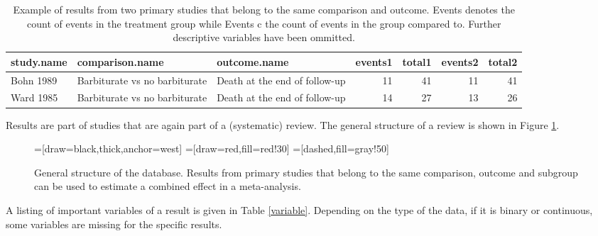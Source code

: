 \documentclass[11pt,a4paper,twoside]{book}\usepackage[]{graphicx}\usepackage[]{color}
\begin{document}
\begin{table}[ht]
\centering
\begingroup\scriptsize
\begin{tabular}{lllrrrr}
  \hline
study.name & comparison.name & outcome.name & events1 & total1 & events2 & total2 \\ 
  \hline
Bohn 1989 & Barbiturate vs no barbiturate & Death at the end of follow-up & 11 & 41 & 11 & 41 \\ 
  Ward 1985 & Barbiturate vs no barbiturate & Death at the end of follow-up & 14 & 27 & 13 & 26 \\ 
   \hline
\end{tabular}
\endgroup
\caption{Example of results from two primary studies that belong to the same comparison and outcome. Events denotes the count of events in the treatment group while Events c the count of events in the group compared to. Further descriptive variables have been ommitted.} 
\label{barbiturate.row}
\end{table}



Results are part of studies that are again part of a (systematic) review. The general structure of a review is shown in Figure \ref{review.structure}.

\begin{figure}
=[draw=black,thick,anchor=west]
=[draw=red,fill=red!30]
=[dashed,fill=gray!50]
\caption{General structure of the database. Results from primary studies that belong to the same comparison, outcome and subgroup can be used to estimate a combined effect in a meta-analysis.}
\label{review.structure}
\end{figure}

A listing of important variables of a result is given in Table \ref{variable}. Depending on the type of the data, \eg if it is binary or continuous, some variables are missing for the specific results.
\end{document}
